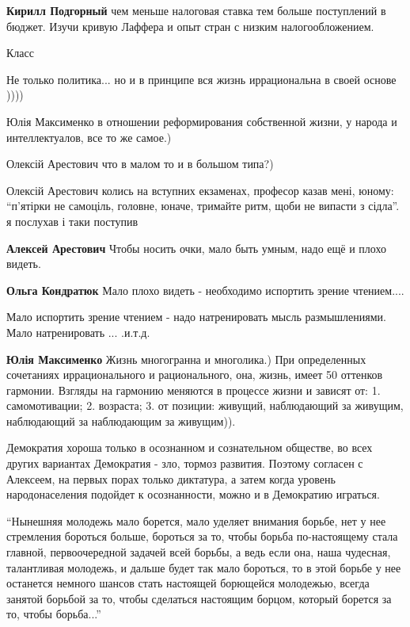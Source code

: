 \begin{itemize}

\textbf{Кирилл Подгорный} чем меньше налоговая ставка тем больше поступлений в
бюджет.  Изучи кривую Лаффера и опыт стран с низким налогообложением.

Класс


Не только политика... но и в принципе вся жизнь иррациональна в своей основе ))))

\begin{itemize}
Юлія Максименко в отношении реформирования собственной жизни, у народа и интеллектуалов, все то же самое.)

Олексій Арестович что в малом то и в большом типа?)


Олексій Арестович колись на вступних екзаменах, професор казав мені, юному:
\enquote{п'ятірки не самоціль, головне, юначе, тримайте ритм, щоби не випасти з сідла}.
я послухав і таки поступив

\textbf{Алексей Арестович} Чтобы носить очки, мало быть умным, надо ещё и плохо видеть.

\textbf{Ольга Кондратюк} Мало плохо видеть - необходимо испортить зрение чтением....

Мало испортить зрение чтением - надо натренировать мысль размышлениями.
Мало натренировать ... .и.т.д.

\textbf{Юлія Максименко}
Жизнь многогранна и многолика.)
При определенных сочетаниях иррационального и рационального, она, жизнь, имеет 50 оттенков гармонии.
Взгляды на гармонию меняются в процессе жизни и зависят от:
1. самомотивации;
2. возраста;
3. от позиции:
живущий,
наблюдающий за живущим,
наблюдающий за наблюдающим за живущим)).
\end{itemize}


Демократия хороша только в осознанном и сознательном обществе, во всех других
вариантах Демократия - зло, тормоз развития. Поэтому согласен с Алексеем, на
первых порах только диктатура, а затем когда уровень народонаселения подойдет к
осознанности, можно и в Демократию играться.


\enquote{Нынешняя молодежь мало борется, мало уделяет внимания борьбе, нет у нее
стремления бороться больше, бороться за то, чтобы борьба по-настоящему стала
главной, первоочередной задачей всей борьбы, а ведь если она, наша чудесная,
талантливая молодежь, и дальше будет так мало бороться, то в этой борьбе у нее
останется немного шансов стать настоящей борющейся молодежью, всегда занятой
борьбой за то, чтобы сделаться настоящим борцом, который борется за то, чтобы
борьба...} 


\end{itemize}
